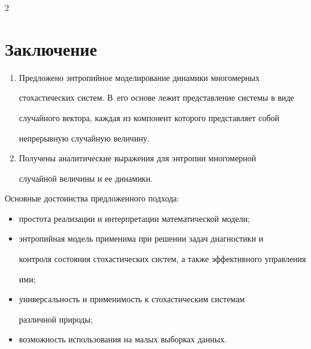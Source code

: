\begin{multicols}{2}
  

  \section{Заключение}

  

  \noindent

  \begin{enumerate}[1.]

  \item  Предложено энтропийное моделирование динамики многомерных 

стохастических систем. В~его основе лежит представление системы в виде 

случайного вектора, каждая из компонент которого представляет собой 

непрерывную случайную величину.

\item Получены аналитические выражения для энтропии многомерной 

случайной величины и ее динамики.

\end{enumerate}



Основные достоинства предложенного подхода:

  \begin{itemize}

  \item простота реализации и интерпретации математической модели;

  \item энтропийная модель применима при решении задач диагностики и 

контроля состояния стохастических сис\-тем, а также эффективного управ\-ле\-ния 

ими;

  \item универсальность и применимость к стохастическим системам 

различной природы;

  \item возможность использования на малых выборках данных.

  \end{itemize}

  

{\small\frenchspacing

{%


}}
\end{multicols}
